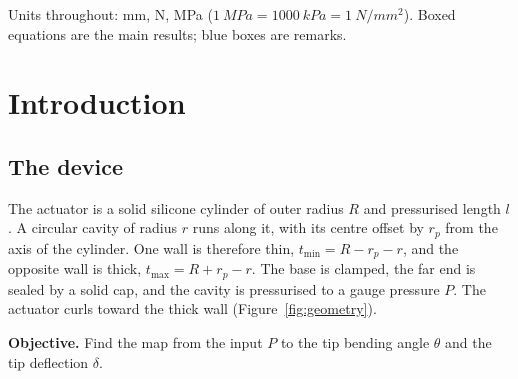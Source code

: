 \documentclass[11pt,a4paper]{article}
\numberwithin{equation}{section}
\newcommand{\rp}{r_p}
\newcommand{\tmin}{t_{\min}}
\newcommand{\tmax}{t_{\max}}
\begin{document}
\tableofcontents
\vspace{1em}
\begin{remark}[Units]
Units throughout: \si{mm}, \si{N}, \si{MPa} ($\SI{1}{MPa}=\SI{1000}{kPa}=\SI{1}{N/mm^2}$).
Boxed equations are the main results; blue boxes are remarks.
\end{remark}

\newpage
\section{Introduction}

\subsection{The device}
The actuator is a solid silicone cylinder of outer radius $R$ and pressurised length $l$. A circular
cavity of radius $r$ runs along it, with its centre offset by $\rp$ from the axis of the cylinder.
One wall is therefore thin, $\tmin = R-\rp-r$, and the opposite wall is thick, $\tmax = R+\rp-r$.
The base is clamped, the far end is sealed by a solid cap, and the cavity is pressurised to a gauge pressure $P$.
The actuator curls toward the thick wall (Figure~\ref{fig:geometry}).

\textbf{Objective.} Find the map from the input $P$ to the tip bending angle $\theta$ and the tip deflection $\delta$.
\end{document}
